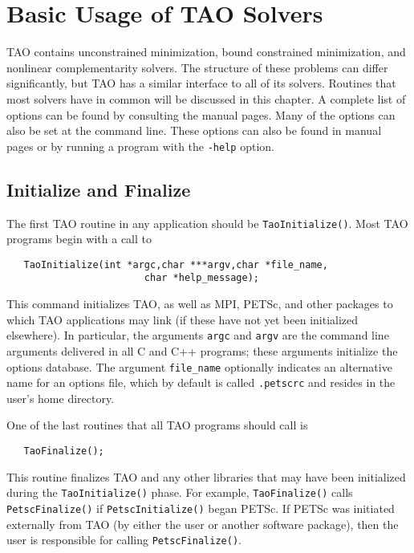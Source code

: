 %
%

\chapter{Basic Usage of TAO Solvers}
\label{chapter:tao_solver}

TAO contains unconstrained minimization, bound constrained minimization, 
and nonlinear complementarity solvers.
The structure of these problems can differ significantly, 
but TAO has a similar interface to all of its solvers.  
Routines that most solvers have in common will be discussed in 
this chapter.
A complete list of options can be found by consulting the manual pages.
Many of the options can also be set at the command line.  These options
can also be found in manual pages or by
running a program with the {\tt -help} option.


\section{Initialize and Finalize}
The first TAO routine in any application should be {\tt TaoInitialize()}.
Most TAO programs begin with a call to
\begin{verbatim}
   TaoInitialize(int *argc,char ***argv,char *file_name, 
                        char *help_message);
\end{verbatim}
\noindent
This command initializes TAO, as well as MPI, PETSc, and other packages
to which TAO applications may link (if these have not yet
been initialized elsewhere).  
In particular, the arguments {\tt argc} and 
{\tt argv} are the command line arguments delivered in all C and C++
programs; these arguments initialize the options database.  
 The argument {\tt file\_name}
optionally indicates an alternative name for an options file, which by
default is called {\tt .petscrc} and resides in the user's home directory.

One of the last routines that all TAO programs should 
call is 
\begin{verbatim}
   TaoFinalize();
\end{verbatim}
\noindent
This routine finalizes TAO and any other libraries that may have been
initialized during the {\tt TaoInitialize()} phase.
For example, {\tt TaoFinalize()}
calls {\tt PetscFinalize()} 
if {\tt PetscInitialize()}
began PETSc. If PETSc was initiated externally from TAO (by either
the user or another software package), then the user is
responsible for calling {\tt PetscFinalize()}. 

